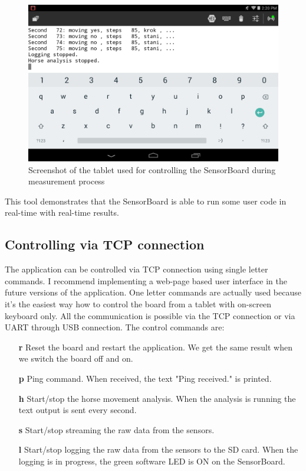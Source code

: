 \begin{figure}
	\centering
	\label{fig:HorseAnalysisTablet}
	\caption{Screenshot of the tablet used for controlling the SensorBoard during measurement process}
	\includegraphics[width=16cm]{img/HorseAnalysisTablet.png}
\end{figure}

This tool demonstrates that the SensorBoard is able to run some user code in real-time with real-time results.

\subsection{Controlling via TCP connection}
The application can be controlled via TCP connection using single letter commands. I recommend implementing a web-page based user interface in the future versions of the application. One letter commands are actually used because it's the easiest way how to control the board from a tablet with on-screen keyboard only. All the communication is possible via the TCP connection or via UART through USB connection. The control commands are:

\begin{itemize}
	\item[\textbf{r}] Reset the board and restart the application. We get the same result when we switch the board off and on.
	\item[\textbf{p}] Ping command. When received, the text "Ping received." is printed.
	\item[\textbf{h}] Start/stop the horse movement analysis. When the analysis is running the text output is sent every second.
	\item[\textbf{s}] Start/stop streaming the raw data from the sensors.
	\item[\textbf{l}] Start/stop logging the raw data from the sensors to the SD card. When the logging is in progress, the green software LED is ON on the SensorBoard.
\end{itemize}

